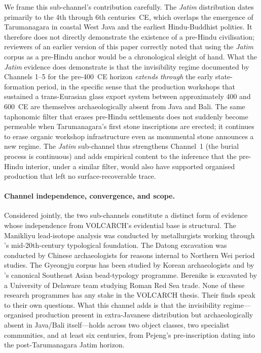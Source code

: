 \documentclass[12pt,a4paper]{article}
\begin{document}
We frame this sub-channel's contribution carefully. The \textit{Jatim} distribution dates primarily to the 4th through 6th centuries~CE, which overlaps the emergence of Tarumanagara in coastal West Java and the earliest Hindu-Buddhist polities. It therefore does not directly demonstrate the existence of a pre-Hindu civilisation; reviewers of an earlier version of this paper correctly noted that using the \textit{Jatim} corpus as a pre-Hindu anchor would be a chronological sleight of hand. What the \textit{Jatim} evidence does demonstrate is that the invisibility regime documented by Channels 1--5 for the pre-400~CE horizon \textit{extends through} the early state-formation period, in the specific sense that the production workshops that sustained a trans-Eurasian glass export system between approximately 400 and 600~CE are themselves archaeologically absent from Java and Bali. The same taphonomic filter that erases pre-Hindu settlements does not suddenly become permeable when Tarumanagara's first stone inscriptions are erected; it continues to erase organic workshop infrastructure even as monumental stone announces a new regime. The \textit{Jatim} sub-channel thus strengthens Channel~1 (the burial process is continuous) and adds empirical content to the inference that the pre-Hindu interior, under a similar filter, would also have supported organised production that left no surface-recoverable trace.

\paragraph{Channel independence, convergence, and scope.} Considered jointly, the two sub-channels constitute a distinct form of evidence whose independence from VOLCARCH's evidential base is structural. The Manikliyu lead-isotope analysis was conducted by metallurgists working through \citeauthor{bernetkempers1988}'s mid-20th-century typological foundation. The Datong excavation was conducted by Chinese archaeologists for reasons internal to Northern Wei period studies. The Gyeongju corpus has been studied by Korean archaeologists and by \citeauthor{lankton2008}'s canonical Southeast Asian bead-typology programme. Berenike is excavated by a University of Delaware team studying Roman Red Sea trade. None of these research programmes has any stake in the VOLCARCH thesis. Their finds speak to their own questions. What this channel adds is that the invisibility regime---organised production present in extra-Javanese distribution but archaeologically absent in Java/Bali itself---holds across two object classes, two specialist communities, and at least six centuries, from Pejeng's pre-inscription dating into the post-Tarumanagara Jatim horizon.
\end{document}
